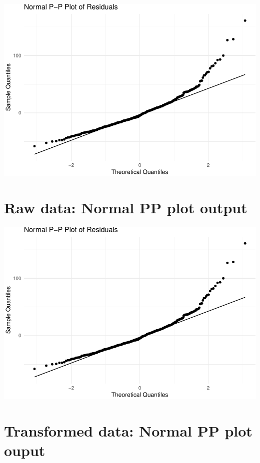 \documentclass[
]{article}
\begin{document}
\includegraphics{L7_Correlation_and_regression_pdf_files/figure-latex/unnamed-chunk-13-1.pdf}

\hypertarget{raw-data-normal-pp-plot-output}{%
\section{Raw data: Normal PP plot
output}\label{raw-data-normal-pp-plot-output}}

\includegraphics{L7_Correlation_and_regression_pdf_files/figure-latex/unnamed-chunk-14-1.pdf}

\hypertarget{transformed-data-normal-pp-plot-ouput}{%
\section{Transformed data: Normal PP plot
ouput}\label{transformed-data-normal-pp-plot-ouput}}
\end{document}
